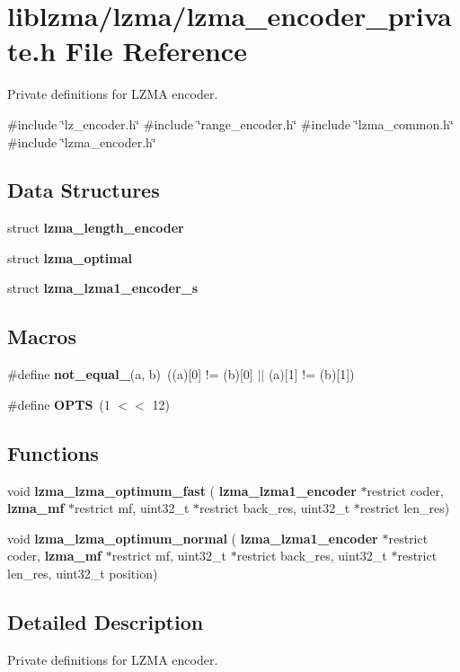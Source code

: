 \section{liblzma/lzma/lzma\+\_\+encoder\+\_\+private.h File Reference}
\label{lzma__encoder__private_8h}


Private definitions for L\+Z\+MA encoder.  


{\ttfamily \#include \char`\"{}lz\+\_\+encoder.\+h\char`\"{}}\newline
{\ttfamily \#include \char`\"{}range\+\_\+encoder.\+h\char`\"{}}\newline
{\ttfamily \#include \char`\"{}lzma\+\_\+common.\+h\char`\"{}}\newline
{\ttfamily \#include \char`\"{}lzma\+\_\+encoder.\+h\char`\"{}}\newline
\subsection*{Data Structures}
\begin{DoxyCompactItemize}
\item 
struct \textbf{ lzma\+\_\+length\+\_\+encoder}
\item 
struct \textbf{ lzma\+\_\+optimal}
\item 
struct \textbf{ lzma\+\_\+lzma1\+\_\+encoder\+\_\+s}
\end{DoxyCompactItemize}
\subsection*{Macros}
\begin{DoxyCompactItemize}
\item 
\mbox{\label{lzma__encoder__private_8h_a9e791f02547e7aa0572e899bba218a3f}} 
\#define {\bfseries not\+\_\+equal\+\_}(a,  b)~((a)[0] != (b)[0] $\vert$$\vert$ (a)[1] != (b)[1])
\item 
\mbox{\label{lzma__encoder__private_8h_a1e3bf8c87fd72574fee33e7bf0482892}} 
\#define {\bfseries O\+P\+TS}~(1 $<$$<$ 12)
\end{DoxyCompactItemize}
\subsection*{Functions}
\begin{DoxyCompactItemize}
\item 
\mbox{\label{lzma__encoder__private_8h_a98a5417f4d43aad0775c0a665dabb294}} 
void {\bfseries lzma\+\_\+lzma\+\_\+optimum\+\_\+fast} (\textbf{ lzma\+\_\+lzma1\+\_\+encoder} $\ast$restrict coder, \textbf{ lzma\+\_\+mf} $\ast$restrict mf, uint32\+\_\+t $\ast$restrict back\+\_\+res, uint32\+\_\+t $\ast$restrict len\+\_\+res)
\item 
\mbox{\label{lzma__encoder__private_8h_a7f0108fbce902f375db5a3e10cd3de13}} 
void {\bfseries lzma\+\_\+lzma\+\_\+optimum\+\_\+normal} (\textbf{ lzma\+\_\+lzma1\+\_\+encoder} $\ast$restrict coder, \textbf{ lzma\+\_\+mf} $\ast$restrict mf, uint32\+\_\+t $\ast$restrict back\+\_\+res, uint32\+\_\+t $\ast$restrict len\+\_\+res, uint32\+\_\+t position)
\end{DoxyCompactItemize}


\subsection{Detailed Description}
Private definitions for L\+Z\+MA encoder. 


